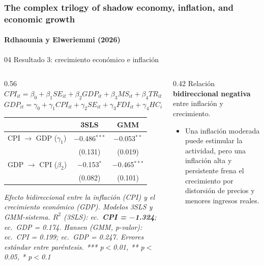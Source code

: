 \documentclass[serif, aspectratio=169]{beamer}
\newcommand{\paperframe}{%
  \frametitle{The complex trilogy of shadow economy, inflation, and economic growth}%
  \framesubtitle{Rdhaounia y Elweriemmi (2026)}}
\begin{document}
\begin{frame}
\paperframe
\begin{block}{04 \quad Resultado 3: crecimiento económico e inflación}\end{block}
\begin{columns}[T]
\begin{column}{0.56\textwidth}
\centering
{\scriptsize
$CPI_{it} = \beta_0 + \beta_1 SE_{it} + \beta_2 GDP_{it} + \beta_3 MS_{it} + \beta_4 TR_{it} + \beta_5 HC_{it} + \epsilon_{it}$\\[2pt]
$GDP_{it} = \gamma_0 + \gamma_1 CPI_{it} + \gamma_2 SE_{it} + \gamma_3 FDI_{it} + \gamma_4 HC_{it} + \theta_{it}$}

\vspace{4pt}
{\scriptsize
\begin{tabular}{lcc}
\toprule
 & \textbf{3SLS} & \textbf{GMM} \\
\midrule
CPI $\rightarrow$ GDP ($\gamma_1$) & $-$0.486$^{***}$ & $-$0.053$^{**}$ \\
                                   & (0.131) & (0.019) \\
GDP $\rightarrow$ CPI ($\beta_2$)  & $-$0.153$^{*}$ & $-$0.465$^{***}$ \\
                                   & (0.082) & (0.101) \\
\bottomrule
\end{tabular}}

\vspace{2pt}
{\tiny\itshape Efecto bidireccional entre la inflación (CPI) y el crecimiento económico (GDP). Modelos 3SLS y GMM-sistema.
$R^2$ (3SLS): ec.\ \textbf{CPI = $-$1.324}; ec.\ GDP = 0.174. Hansen (GMM, p-valor): ec.\ CPI = 0.199; ec.\ GDP = 0.247.
Errores estándar entre paréntesis. *** p$<$0.01, ** p$<$0.05, * p$<$0.1}
\end{column}
\begin{column}{0.42\textwidth}
\small
Relación \textbf{bidireccional negativa} entre inflación y crecimiento.
\begin{itemize}
  \item Una inflación moderada puede estimular la actividad, pero una inflación alta y persistente frena el crecimiento por distorsión de precios y menores ingresos reales.
\end{itemize}
\end{column}
\end{columns}
\end{frame}
\end{document}
